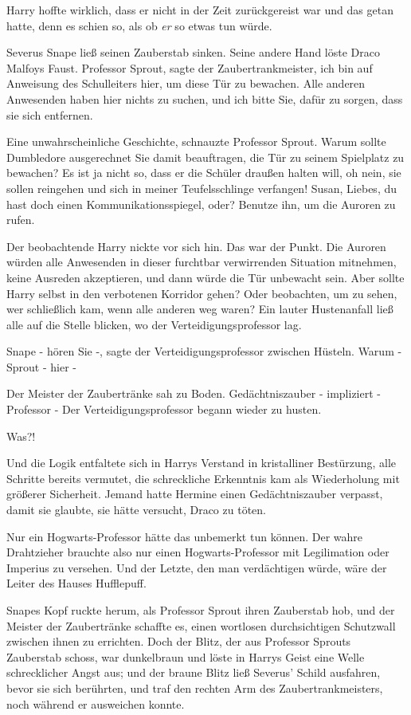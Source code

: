 Harry hoffte wirklich, dass er nicht in der Zeit zurückgereist war und das getan
hatte, denn es schien so, als ob \emph{er} so etwas tun würde.

Severus Snape ließ seinen Zauberstab sinken. Seine andere Hand löste Draco
Malfoys Faust. \glqq{}Professor Sprout\grqq{}, sagte der Zaubertrankmeister,
\glqq{}ich bin auf Anweisung des Schulleiters hier, um diese Tür zu bewachen.
Alle anderen Anwesenden haben hier nichts zu suchen, und ich bitte Sie, dafür zu
sorgen, dass sie sich entfernen.\grqq{}

\glqq{}Eine unwahrscheinliche Geschichte\grqq{}, schnauzte Professor Sprout.
\glqq{}Warum sollte Dumbledore ausgerechnet Sie damit beauftragen, die Tür zu
seinem Spielplatz zu bewachen? Es ist ja nicht so, dass er die Schüler draußen
halten will, oh nein, sie sollen reingehen und sich in meiner Teufelsschlinge
verfangen! Susan, Liebes, du hast doch einen Kommunikationsspiegel, oder?
Benutze ihn, um die Auroren zu rufen.\grqq{}

Der beobachtende Harry nickte vor sich hin. Das war der Punkt. Die Auroren
würden alle Anwesenden in dieser furchtbar verwirrenden Situation mitnehmen,
keine Ausreden akzeptieren, und dann würde die Tür unbewacht sein. Aber sollte
Harry selbst in den verbotenen Korridor gehen? Oder beobachten, um zu sehen, wer
schließlich kam, wenn alle anderen weg waren? Ein lauter Hustenanfall ließ alle
auf die Stelle blicken, wo der Verteidigungsprofessor lag.

\glqq{}Snape - hören Sie -\grqq{}, sagte der Verteidigungsprofessor zwischen
Hüsteln. \glqq{}Warum - Sprout - hier -\grqq{}

Der Meister der Zaubertränke sah zu Boden. \glqq{}Gedächtniszauber - impliziert -
Professor -\grqq{} Der Verteidigungsprofessor begann wieder zu husten.

\glqq{}Was?!\grqq{}

Und die Logik entfaltete sich in Harrys Verstand in kristalliner Bestürzung,
alle Schritte bereits vermutet, die schreckliche Erkenntnis kam als Wiederholung
mit größerer Sicherheit. Jemand hatte Hermine einen Gedächtniszauber verpasst,
damit sie glaubte, sie hätte versucht, Draco zu töten.

Nur ein Hogwarts-Professor hätte das unbemerkt tun können. Der wahre Drahtzieher
brauchte also nur einen Hogwarts-Professor mit Legilimation oder Imperius zu
versehen. Und der Letzte, den man verdächtigen würde, wäre der Leiter des Hauses
Hufflepuff.

Snapes Kopf ruckte herum, als Professor Sprout ihren Zauberstab hob, und der
Meister der Zaubertränke schaffte es, einen wortlosen durchsichtigen Schutzwall
zwischen ihnen zu errichten. Doch der Blitz, der aus Professor Sprouts
Zauberstab schoss, war dunkelbraun und löste in Harrys Geist eine Welle
schrecklicher Angst aus; und der braune Blitz ließ Severus' Schild ausfahren,
bevor sie sich berührten, und traf den rechten Arm des Zaubertrankmeisters, noch
während er ausweichen konnte.

